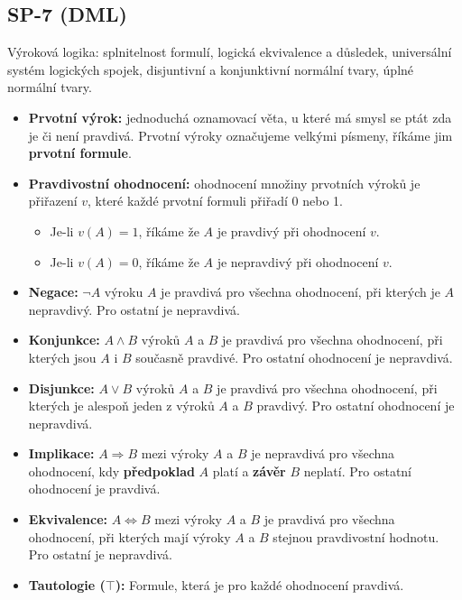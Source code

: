 \subsection{SP-7 (DML)}
Výroková logika: splnitelnost formulí, logická ekvivalence a důsledek, universální systém logických spojek, disjuntivní a konjunktivní normální tvary, úplné normální tvary.
\begin{itemize}
	\item \textbf{Prvotní výrok:} jednoduchá oznamovací věta, u které má smysl se ptát zda je či není pravdivá. Prvotní výroky označujeme velkými písmeny, říkáme jim \textbf{prvotní formule}.

	\item \textbf{Pravdivostní ohodnocení:} ohodnocení množiny prvotních výroků je přiřazení $v$, které každé prvotní formuli přiřadí 0 nebo 1.
	\begin{itemize}
		\item Je-li $v(A)=1$, říkáme že $A$ je pravdivý při ohodnocení $v$.
		\item Je-li $v(A)=0$, říkáme že $A$ je nepravdivý při ohodnocení $v$.
	\end{itemize}

	\item \textbf{Negace:} $\neg A$ výroku $A$ je pravdivá pro všechna ohodnocení, při kterých je $A$ nepravdivý. Pro ostatní je nepravdivá.

	\item \textbf{Konjunkce:} $A \land B$ výroků $A$ a $B$ je pravdivá pro všechna ohodnocení, při kterých jsou $A$ i $B$ současně pravdivé. Pro ostatní ohodnocení je nepravdivá.

	\item \textbf{Disjunkce:} $A \lor B$ výroků $A$ a $B$ je pravdivá pro všechna ohodnocení, při kterých je alespoň jeden z výroků $A$ a $B$ pravdivý. Pro ostatní ohodnocení je nepravdivá.

	\item \textbf{Implikace:} $A \Rightarrow B$ mezi výroky $A$ a $B$ je nepravdivá pro všechna ohodnocení, kdy \textbf{předpoklad} $A$ platí a \textbf{závěr} $B$ neplatí. Pro ostatní ohodnocení je pravdivá.

	\item \textbf{Ekvivalence:} $A \Leftrightarrow B$ mezi výroky $A$ a $B$ je pravdivá pro všechna ohodnocení, při kterých mají výroky $A$ a $B$ stejnou pravdivostní hodnotu. Pro ostatní je nepravdivá.

	\item \textbf{Tautologie ($\top$):} Formule, která je pro každé ohodnocení pravdivá.


\end{itemize}
